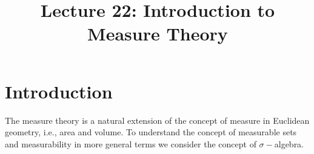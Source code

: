 \documentclass[a4paper,english,12pt]{article}   	%
\title{Lecture 22: Introduction to Measure Theory}
\author{}
\begin{document}
\maketitle
\section{Introduction}
The measure theory is a natural extension of the concept of measure in Euclidean geometry, i.e., area and volume. To understand the concept of measurable sets and measurability in more general terms we consider the concept of $\sigma-$algebra. 
\end{document}
